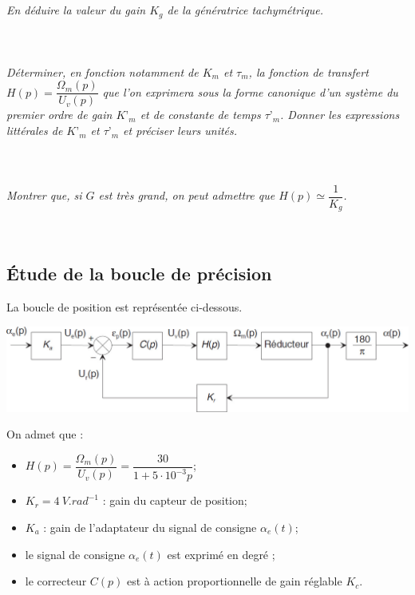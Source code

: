 \documentclass[10pt,fleqn]{article} %
\begin{document}
\begin{multicols}{2}
\subparagraph{}\textit{En déduire la valeur du gain $K_g$ de la génératrice tachymétrique.}
\ifprof
\begin{corrige}~\\
\end{corrige}
\else
\fi

\subparagraph{}\textit{Déterminer, en fonction notamment de $K_m$ et $\tau_m$, la fonction de transfert 
$H(p)=\dfrac{\Omega_m(p)}{U_v(p)}$  que l’on exprimera sous la forme canonique d’un système du premier ordre
de gain $K’_m$ et de constante de temps $\tau’_m$. Donner les expressions littérales de $K’_m$ et $\tau’_m$ et
préciser leurs unités. }
\ifprof
\begin{corrige}~\\
\end{corrige}
\else
\fi

\subparagraph{}\textit{Montrer que, si $G$ est très grand, on peut admettre que $H(p)\simeq \dfrac{1}{K_g}$.}
\ifprof
\begin{corrige}~\\
\end{corrige}
\else
\fi
 
\subsection*{Étude de la boucle de précision}
 La boucle de position est représentée ci-dessous. 
 
 \begin{center}
\includegraphics[width=\linewidth]{images/fig_03}
\end{center}

 
 On admet que : 
 \begin{itemize}
 \item $H(p)=\dfrac{\Omega_m(p)}{U_v(p)}=\dfrac{30}{1+5\cdot 10^{-3}p}$;
 \item $K_r=\SI{4}{V.rad^{-1}}$ : gain du capteur de position;
 \item $K_a$ : gain de l’adaptateur du signal de consigne $\alpha_e(t)$; 
 \item le signal de consigne  $\alpha_e(t)$  est exprimé en degré ; 
 \item le correcteur $C(p)$ est à action proportionnelle de gain réglable $K_c$.
 \end{itemize} 
 

\end{multicols}
\end{document}
